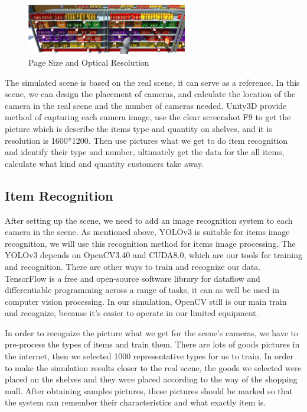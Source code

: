 \begin{figure}[htbp]
\centerline{\includegraphics[width=7cm,scale=0.8]{shelves.jpg}}
\caption{Page Size and Optical Resolution}
\label{fig}
\end{figure}

The simulated scene is based on the real scene, it can serve as a reference.
In this scene, we can design the placement of cameras, and calculate the location of the camera in the real scene and the number of cameras needed.
Unity3D provide method of capturing each camera image, use the clear screenshot F9 to get the picture which is describe the items type and quantity on shelves, and it is resolution is 1600*1200.
Then use pictures what we get to do item recognition and identify their type and number, ultimately get the data for the all items, calculate what kind and quantity customers take away.

\subsection{Item Recognition}

After setting up the scene, we need to add an image recognition system to each camera in the scene.
As mentioned above, YOLOv3 is suitable for items image recognition, we will use this recognition method for items image processing.
The YOLOv3 depends on OpenCV3.40 and CUDA8.0, which are our tools for training and recognition.
There are other ways to train and recognize our data.
TensorFlow\cite{199317} is a free and open-source software library for dataflow and differentiable programming across a range of tasks, it can as well be used in computer vision processing.
In our simulation, OpenCV still is our main train and recognize, because it's easier to operate in our limited equipment.

In order to recognize the picture what we get for the scene's cameras, we have to pre-process the types of items and train them.
There are lots of goods pictures in the internet, then we selected 1000 representative types for us to train.
In order to make the simulation results closer to the real scene, the goods we selected were placed on the shelves and they were placed according to the way of the shopping mall.
After obtaining samples pictures, these pictures should be marked so that the system can remember their characteristics and what exactly item is.


